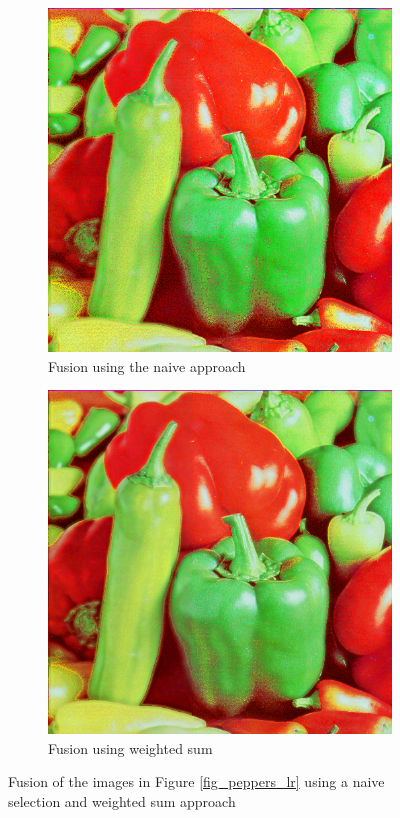 \documentclass[sigconf]{acmart/acmart}
\begin{document}
\begin{figure}[h]
	\centering
	\begin{subfigure}[b]{0.45\textwidth}
		\centering
		\includegraphics[width=\textwidth]{figures/peppers/peppers_fused_naive}
		\caption{Fusion using the naive approach}
		\label{fig_naive_fusion}
	\end{subfigure}
	\begin{subfigure}[b]{0.45\textwidth}
		\centering
		\includegraphics[width=\textwidth]{figures/peppers/peppers_fused}
		\caption{Fusion using weighted sum}
		\label{fig_weighted_fusion}
	\end{subfigure}
	\caption{Fusion of the images in Figure \ref{fig_peppers_lr} using a naive selection and weighted sum approach}
\end{figure}
\end{document}
